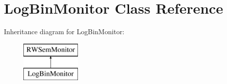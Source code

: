 \hypertarget{classLogBinMonitor}{\section{Log\-Bin\-Monitor Class Reference}
\label{classLogBinMonitor}
}
Inheritance diagram for Log\-Bin\-Monitor\-:\begin{figure}[H]
\begin{center}
\leavevmode
\includegraphics[height=2.000000cm]{classLogBinMonitor}
\end{center}
\end{figure}
